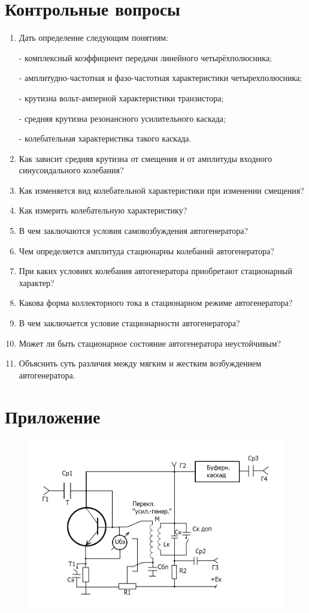 \section{Контрольные вопросы}
\begin{enumerate}
	\item Дать определение следующим понятиям:

	- комплексный коэффициент передачи линейного четырёхполюсника; 

	- амплитудно-частотная и фазо-частотная характеристики четырехполюсника;

	- крутизна вольт-амперной характеристики транзистора;

	- средняя крутизна резонансного усилительного каскада;

	- колебательная характеристика такого каскада.
	\item Как зависит средняя крутизна от смещения и от амплитуды входного синусоидального колебания?
	\item Как изменяется вид колебательной характеристики при изменении смещения?
	\item Как измерить колебательную характеристику?
	\item В чем заключаются условия самовозбуждения автогенератора?
	\item Чем определяется амплитуда стационарны колебаний автогенератора?
	\item При каких условиях колебания автогенератора приобретают стационарный характер?
	\item Какова форма коллекторного тока в стационарном режиме автогенератора?
	\item В чем заключается условие стационарности автогенератора?
	\item Может ли быть стационарное состояние автогенератора неустойчивым?
	\item Объяснить суть различия между мягким и жестким возбуждением автогенератора.
\end{enumerate}
\section{Приложение}

\begin{figure}[H]
	\includegraphics[angle = 90, width=0.75\linewidth]{circuit/fig16}
	\caption{}
	\centering
\end{figure}

